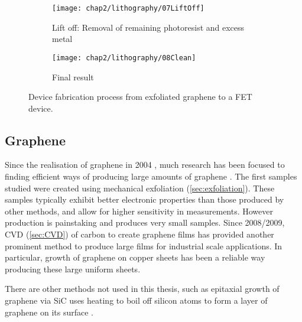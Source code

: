 \documentclass[../../Matt_Gebert_Honours_Thesis.tex]{subfiles}
\begin{document}
	\begin{figure}[H]
	\ContinuedFloat
	\centering
	\begin{subfigure}{0.2\textwidth}
		\centering
		\texttt{[image: chap2/lithography/07LiftOff]}
		\caption{Lift off: Removal of remaining photoresist and excess metal}
	\end{subfigure}
	\hspace{0.04\textwidth}
	\begin{subfigure}{0.2\textwidth}
		\centering
		\texttt{[image: chap2/lithography/08Clean]}
		\caption{Final result}
	\end{subfigure}
	\caption[Process diagram for device fabrication]{Device fabrication process from exfoliated graphene to a FET device.}\label{fig:litho}
	\end{figure}
	
	\subsection{Graphene}
	Since the realisation of graphene in 2004 \cite{novoselov_electric_2004}, much research has been focused to finding efficient ways of producing large amounts of graphene \cite{zhang_review_2013}. The first samples studied were created using mechanical exfoliation (\cref{sec:exfoliation})\cite{novoselov_two-dimensional_2005}. These samples typically exhibit better electronic properties than those produced by other methods, and allow for higher sensitivity in measurements. However production is painstaking and produces very small samples.
	Since 2008/2009, CVD (\cref{sec:CVD}) of carbon to create graphene films has provided another prominent method to produce large films for industrial scale applications. In particular, growth of graphene on copper sheets \cite{li_large-area_2009} has been a reliable way producing these large uniform sheets.
	
	There are other methods not used in this thesis, such as epitaxial growth of graphene via SiC uses heating to boil off silicon atoms to form a layer of graphene on its surface \cite{berger_ultrathin_2004,hass_highly_2006}.
	
\end{document}
